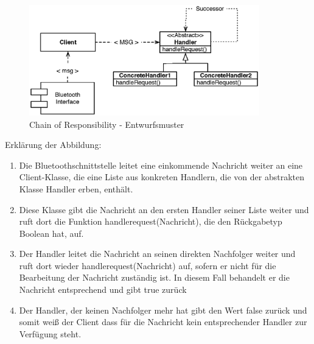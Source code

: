 \documentclass[10pt,a4paper]{article}
\begin{document}
			\begin{figure}[h]
				\centering
				\includegraphics[width=10cm]{images/android_handler.eps}
  				\caption{Chain of Responsibility - Entwurfsmuster}
  			\end{figure}	
  			Erklärung der Abbildung:
   			\begin{enumerate}
  				\item Die Bluetoothschnittstelle leitet eine einkommende Nachricht weiter an eine Client-Klasse, die eine Liste aus konkreten Handlern,
  					die von der abstrakten Klasse Handler erben, enthält.
  				\item Diese Klasse gibt die Nachricht an den ersten Handler seiner Liste weiter und ruft dort die Funktion handlerequest(Nachricht),
  					die den Rückgabetyp Boolean hat, auf.
  				\item Der Handler leitet die Nachricht an seinen direkten Nachfolger weiter und ruft dort wieder handlerequest(Nachricht) auf, sofern
  					er nicht für die Bearbeitung der Nachricht zuständig ist. In diesem Fall behandelt er die Nachricht entsprechend und gibt true zurück
  				\item Der Handler, der keinen Nachfolger mehr hat gibt den Wert false zurück und somit weiß der Client dass für die Nachricht kein
  					entsprechender Handler zur Verfügung steht.  					
  			\end{enumerate}   
\end{document}

